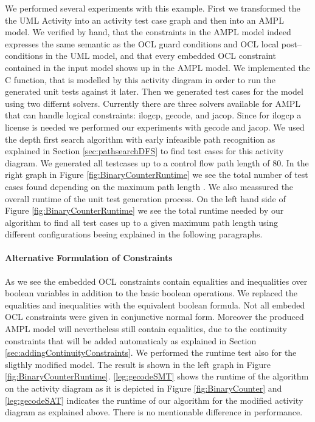 We performed several experiments with this example. First we transformed the the UML Activity into an activity test case graph and then into an AMPL model. We verified by hand, that the constraints in the AMPL model indeed expresses the same semantic as the OCL guard conditions and OCL local post--conditions in the UML model, and that every embedded OCL constraint contained in the input model shows up in the AMPL model. We implemented the C function, that is modelled by this activity diagram in order to run the generated unit tests against it later. Then we generated test cases for the model using two differnt solvers. Currently there are three solvers available for AMPL that can handle logical constraints: ilogcp, gecode, and jacop. Since for ilogcp a license is needed we performed our experiments with gecode and jacop. We used the depth first search algorithm with early infeasible path recognition as explained in Section \ref{sec:pathsearchDFS} to find test cases for this activity diagram. We generated all testcases up to a control flow path length of 80. In the right graph in Figure \ref{fig:BinaryCounterRuntime} we see the total number of test cases found depending on the maximum path length%
. We also meassured the overall runtime of the unit test generation process. On the left hand side of Figure \ref{fig:BinaryCounterRuntime} we see the total runtime needed by our algorithm to find all test cases up to a given maximum path length using different configurations beeing explained in the following paragraphs.
\paragraph{Alternative Formulation of Constraints}
As we see the embedded OCL constraints contain equalities and inequalities over boolean variables in addition to the basic boolean operations. We replaced the equalities and inequalities with the equivalent boolean formula. Not all embeded OCL constraints were given in conjunctive normal form. Moreover the produced AMPL model will nevertheless still contain equalities, due to the continuity constraints that will be added automaticaly as explained in Section \ref{sec:addingContinuityConstraints}.%
We performed the runtime test also for the sligthly modified model. The result is shown in the left graph in Figure \ref{fig:BinaryCounterRuntime}. \ref{leg:gecodeSMT} shows the runtime of the algorithm on the activity diagram as it is depicted in Figure \ref{fig:BinaryCounter} and \ref{leg:gecodeSAT} indicates the runtime of our algorithm for the modified activity diagram as explained above. There is no mentionable difference in performance.%
